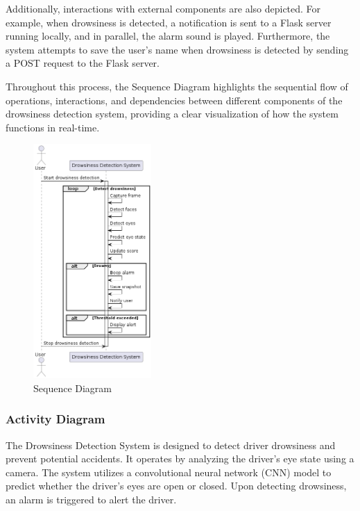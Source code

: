 \documentclass[12pt]{article}
\begin{document}
Additionally, interactions with external components are also depicted. For example, when drowsiness is detected, a notification is sent to a Flask server running locally, and in parallel, the alarm sound is played. Furthermore, the system attempts to save the user's name when drowsiness is detected by sending a POST request to the Flask server.

Throughout this process, the Sequence Diagram highlights the sequential flow of operations, interactions, and dependencies between different components of the drowsiness detection system, providing a clear visualization of how the system functions in real-time.
\begin{figure}[h]
\centering
\includegraphics[width=0.4\textwidth]{seq}
\caption{Sequence Diagram}
\end{figure}
\FloatBarrier


\subsubsection{Activity Diagram}

The Drowsiness Detection System is designed to detect driver drowsiness and prevent potential accidents. It operates by analyzing the driver's eye state using a camera. The system utilizes a convolutional neural network (CNN) model to predict whether the driver's eyes are open or closed. Upon detecting drowsiness, an alarm is triggered to alert the driver. 
\end{document}
